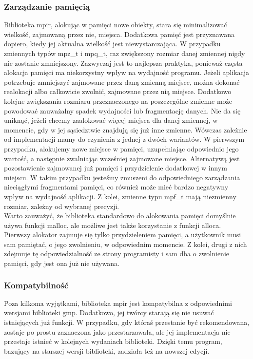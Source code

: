 \documentclass[twoside,a4paper]{book}
\begin{document}
\subsubsection{Zarządzanie pamięcią}
Biblioteka mpir, alokując w pamięci nowe obiekty, stara się minimalizować wielkość, zajmowaną przez nie, miejsca. Dodatkowa pamięć jest przyznawana dopiero, kiedy jej aktualna wielkość jest niewystarczająca. W przypadku zmiennych typów mpz\_t i mpq\_t, raz zwiększony rozmiar danej zmiennej nigdy nie zostanie zmniejszony. Zazwyczaj jest to najlepsza praktyka, ponieważ częsta alokacja pamięci ma niekorzystny wpływ na wydajność programu. Jeżeli aplikacja potrzebuje zmniejszyć zajmowane przez daną zmienną miejsce, można dokonać realokacji albo całkowicie zwolnić, zajmowane przez nią miejsce. Dodatkowo kolejne zwiększania rozmiaru przeznaczonego na poszczególne zmienne może powodować zauważalny spadek wydajności lub fragmentację danych. Nie da się uniknąć, jeżeli chcemy zaalokować więcej miejsca dla danej zmiennej, w momencie, gdy w jej sąsiedztwie znajdują się już inne zmienne. Wówczas zależnie od implementacji mamy do czynienia z jednej z dwóch wariantów. W pierwszym przypadku, alokujemy nowe miejsce w pamięci, uzupełniając odpowiednio jego wartość, a następnie zwalniając wcześniej zajmowane miejsce. Alternatywą jest pozostawienie zajmowanej już pamięci i przydzielenie dodatkowej w innym miejscu. W takim przypadku jesteśmy zmuszeni do odpowiedniego zarządzania nieciągłymi fragmentami pamięci, co również może mieć bardzo negatywny wpływ na wydajność aplikacji. Z kolei, zmienne typu mpf\_t mają niezmienny rozmiar, zależny od wybranej precyzji. \\
Warto zauważyć, że biblioteka standardowo do alokowania pamięci domyślnie używa funkcji malloc, ale możliwe jest także korzystanie z funkcji alloca. Pierwszy alokator zajmuje się tylko przydzieleniem pamięci, a użytkownik musi sam pamiętać, o jego zwolnieniu, w odpowiednim momencie. Z kolei, drugi z nich zdejmuje tę odpowiedzialność ze strony programisty i sam dba o zwolnienie pamięci, gdy jest ona już nie używana.

\subsubsection{Kompatybilność}
Poza kilkoma wyjątkami, biblioteka mpir jest kompatybilna z odpowiednimi wersjami biblioteki gmp. Dodatkowo, jej twórcy starają się nie usuwać istniejących już funkcji. W przypadku, gdy któraś przestanie być rekomendowana, zostaje po prostu zaznaczona jako przestarzawała, ale jej implementacja nie przestaje istnieć w kolejnych wydaniach biblioteki. Dzięki temu program, bazujący na starszej wersji biblioteki, zadziała też na nowszej edycji.
\end{document}
